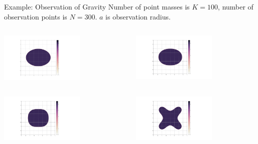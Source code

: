 \documentclass[dvipdfmx]{beamer}
\theoremstyle{remark}
\begin{document}
\begin{frame}{Example: Observation of Gravity}
  Number of point masses is $K=100$, number of observation points is $N=300$.
  $a$ is observation radius.

  \begin{columns}
    \begin{column}{0.38\columnwidth}
      \centering
      \includegraphics[width=4cm]{fig/elliptic.png}
      \captionsetup[figure]{labelformat=empty,labelsep=none}
    \end{column}
    \hspace{-1cm}
    \begin{column}{0.38\columnwidth}
      \centering
      \includegraphics[width=4cm]{fig2/GN300K100R10E2.png}
      \captionsetup[figure]{labelformat=empty,labelsep=none}
    \end{column}
  \end{columns}

  \begin{columns}
    \begin{column}{0.38\columnwidth}
      \centering
      \includegraphics[width=4cm]{fig2/GN300K100R30E2.png}
      \captionsetup[figure]{labelformat=empty,labelsep=none}
    \end{column}
    \hspace{-1cm}
    \begin{column}{0.38\columnwidth}
      \centering
      \includegraphics[width=4cm]{fig3/GN300K100R200E2.png}
      \captionsetup[figure]{labelformat=empty,labelsep=none}
    \end{column}
  \end{columns}


\end{frame}
\end{document}
